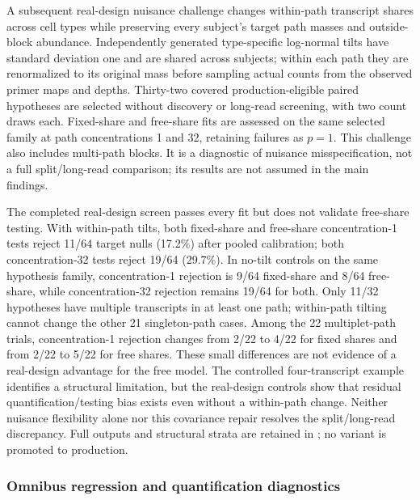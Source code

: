 \documentclass[11pt]{article}
\begin{document}
A subsequent real-design nuisance challenge changes within-path transcript shares across cell types while preserving every subject's target path masses and outside-block abundance. Independently generated type-specific log-normal tilts have standard deviation one and are shared across subjects; within each path they are renormalized to its original mass before sampling actual counts from the observed primer maps and depths. Thirty-two covered production-eligible paired hypotheses are selected without discovery or long-read screening, with two count draws each. Fixed-share and free-share fits are assessed on the same selected family at path concentrations 1 and 32, retaining failures as \(p=1\). This challenge also includes multi-path blocks. It is a diagnostic of nuisance misspecification, not a full split/long-read comparison; its results are not assumed in the main findings.

The completed real-design screen passes every fit but does not validate free-share testing. With within-path tilts, both fixed-share and free-share concentration-1 tests reject 11/64 target nulls (17.2\%) after pooled calibration; both concentration-32 tests reject 19/64 (29.7\%). In no-tilt controls on the same hypothesis family, concentration-1 rejection is 9/64 fixed-share and 8/64 free-share, while concentration-32 rejection remains 19/64 for both. Only 11/32 hypotheses have multiple transcripts in at least one path; within-path tilting cannot change the other 21 singleton-path cases. Among the 22 multiplet-path trials, concentration-1 rejection changes from 2/22 to 4/22 for fixed shares and from 2/22 to 5/22 for free shares. These small differences are not evidence of a real-design advantage for the free model. The controlled four-transcript example identifies a structural limitation, but the real-design controls show that residual quantification/testing bias exists even without a within-path change. Neither nuisance flexibility alone nor this covariance repair resolves the split/long-read discrepancy. Full outputs and structural strata are retained in ; no variant is promoted to production.

\subsubsection*{Omnibus regression and quantification diagnostics}
\end{document}
